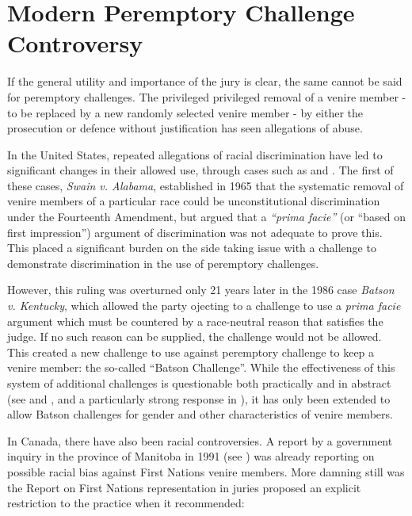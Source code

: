 \section{Modern Peremptory Challenge Controversy} \label{sec:modper}

If the general utility and importance of the jury is clear, the same cannot be said for peremptory challenges. The privileged
privileged removal of a venire member - to be replaced by a new randomly selected venire member -  by either the prosecution or
defence without justification has seen allegations of abuse.

In the United States, repeated allegations of racial discrimination have led to significant changes in their allowed use, through
cases such as \cite{swainvalabama} and \cite{batsonvkentucky}. The first of these cases, \textit{Swain v. Alabama},
established in 1965 that the systematic removal of venire members of a particular race could be unconstitutional discrimination
under the Fourteenth Amendment, but argued that a \textit{``prima facie''} (or ``based on first impression'') argument of
discrimination was not adequate to prove this. This placed a significant burden on the side taking issue with a challenge to
demonstrate discrimination in the use of peremptory challenges.

However, this ruling was overturned only 21 years later in the 1986 case \textit{Batson v. Kentucky}, which allowed the
party ojecting to a challenge to use a \textit{prima facie} argument which must be countered by a race-neutral reason that
satisfies the judge. If no such reason can be supplied, the challenge would not be allowed. This created a new challenge to use
against peremptory challenge to keep a venire member: the so-called ``Batson Challenge''. While the effectiveness of this system
of additional challenges is questionable both practically and in abstract (see \cite{page2005} and \cite{morehead1994}, and a
particularly strong response in \cite{hoffman1997}), it has only been extended to allow Batson challenges for gender and other
characteristics of venire members.

In Canada, there have also been racial controversies. A report by a government inquiry in the province of Manitoba in 1991 (see 
\cite{goodfirststep}) was already reporting on possible racial bias against First Nations venire members. More damning still was
the \cite{iacobuccireport} Report on First Nations representation in juries proposed an explicit restriction to the practice when
it recommended:

